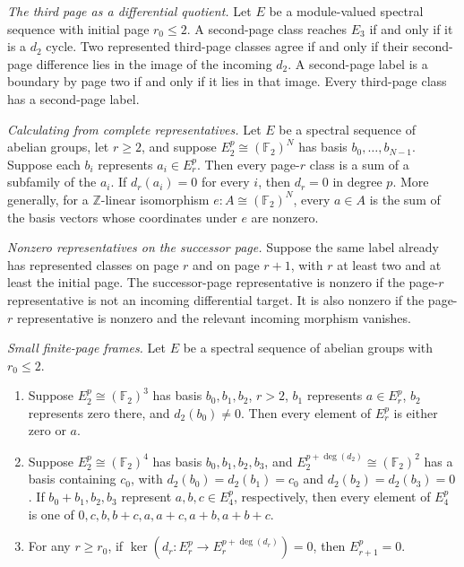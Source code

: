 \begin{theorem}
\label{sem:SpectralSequence:representative-expansion}
\textit{The third page as a differential quotient.} Let $E$ be a module-valued spectral sequence with initial page $r_0\leq2$. A second-page class reaches $E_3$ if and only if it is a $d_2$ cycle. Two represented third-page classes agree if and only if their second-page difference lies in the image of the incoming $d_2$. A second-page label is a boundary by page two if and only if it lies in that image. Every third-page class has a second-page label.

\textit{Calculating from complete representatives.} Let $E$ be a spectral sequence of abelian groups, let $r\geq2$, and suppose $E_2^p\cong(\mathbb F_2)^N$ has basis $b_0,\ldots,b_{N-1}$. Suppose each $b_i$ represents $a_i\in E_r^p$. Then every page-$r$ class is a sum of a subfamily of the $a_i$. If $d_r(a_i)=0$ for every $i$, then $d_r=0$ in degree $p$. More generally, for a $\mathbb Z$-linear isomorphism $e:A\cong(\mathbb F_2)^N$, every $a\in A$ is the sum of the basis vectors whose coordinates under $e$ are nonzero.

\textit{Nonzero representatives on the successor page.} Suppose the same label already has represented classes on page $r$ and on page $r+1$, with $r$ at least two and at least the initial page. The successor-page representative is nonzero if the page-$r$ representative is not an incoming differential target. It is also nonzero if the page-$r$ representative is nonzero and the relevant incoming morphism vanishes.

\textit{Small finite-page frames.} Let $E$ be a spectral sequence of abelian groups with $r_0\leq2$.
\begin{enumerate}
\item Suppose $E_2^p\cong(\mathbb F_2)^3$ has basis $b_0,b_1,b_2$, $r>2$, $b_1$ represents $a\in E_r^p$, $b_2$ represents zero there, and $d_2(b_0)\neq0$. Then every element of $E_r^p$ is either zero or $a$.
\item Suppose $E_2^p\cong(\mathbb F_2)^4$ has basis $b_0,b_1,b_2,b_3$, and $E_2^{p+\deg(d_2)}\cong(\mathbb F_2)^2$ has a basis containing $c_0$, with $d_2(b_0)=d_2(b_1)=c_0$ and $d_2(b_2)=d_2(b_3)=0$. If $b_0+b_1,b_2,b_3$ represent $a,b,c\in E_4^p$, respectively, then every element of $E_4^p$ is one of $0,c,b,b+c,a,a+c,a+b,a+b+c$.
\item For any $r\geq r_0$, if $\ker(d_r:E_r^p\to E_r^{p+\deg(d_r)})=0$, then $E_{r+1}^p=0$.
\end{enumerate}
\end{theorem}
